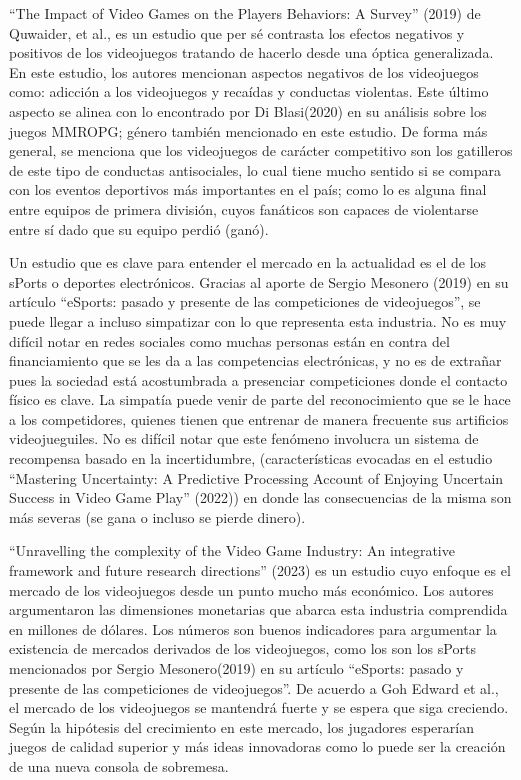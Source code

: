 \documentclass[
  letterpaper,
  DIV=11,
  numbers=noendperiod]{scrreprt}
\begin{document}
``The Impact of Video Games on the Players Behaviors: A Survey'' (2019)
de Quwaider, et al., es un estudio que per sé contrasta los efectos
negativos y positivos de los videojuegos tratando de hacerlo desde una
óptica generalizada. En este estudio, los autores mencionan aspectos
negativos de los videojuegos como: adicción a los videojuegos y recaídas
y conductas violentas. Este último aspecto se alinea con lo encontrado
por Di Blasi(2020) en su análisis sobre los juegos MMROPG; género
también mencionado en este estudio. De forma más general, se menciona
que los videojuegos de carácter competitivo son los gatilleros de este
tipo de conductas antisociales, lo cual tiene mucho sentido si se
compara con los eventos deportivos más importantes en el país; como lo
es alguna final entre equipos de primera división, cuyos fanáticos son
capaces de violentarse entre sí dado que su equipo perdió (ganó).

Un estudio que es clave para entender el mercado en la actualidad es el
de los sPorts o deportes electrónicos. Gracias al aporte de Sergio
Mesonero (2019) en su artículo ``eSports: pasado y presente de las
competiciones de videojuegos'', se puede llegar a incluso simpatizar con
lo que representa esta industria. No es muy difícil notar en redes
sociales como muchas personas están en contra del financiamiento que se
les da a las competencias electrónicas, y no es de extrañar pues la
sociedad está acostumbrada a presenciar competiciones donde el contacto
físico es clave. La simpatía puede venir de parte del reconocimiento que
se le hace a los competidores, quienes tienen que entrenar de manera
frecuente sus artificios videojueguiles. No es difícil notar que este
fenómeno involucra un sistema de recompensa basado en la incertidumbre,
(características evocadas en el estudio ``Mastering Uncertainty: A
Predictive Processing Account of Enjoying Uncertain Success in Video
Game Play'' (2022)) en donde las consecuencias de la misma son más
severas (se gana o incluso se pierde dinero).

``Unravelling the complexity of the Video Game Industry: An integrative
framework and future research directions'' (2023) es un estudio cuyo
enfoque es el mercado de los videojuegos desde un punto mucho más
económico. Los autores argumentaron las dimensiones monetarias que
abarca esta industria comprendida en millones de dólares. Los números
son buenos indicadores para argumentar la existencia de mercados
derivados de los videojuegos, como los son los sPorts mencionados por
Sergio Mesonero(2019) en su artículo ``eSports: pasado y presente de las
competiciones de videojuegos''. De acuerdo a Goh Edward et al., el
mercado de los videojuegos se mantendrá fuerte y se espera que siga
creciendo. Según la hipótesis del crecimiento en este mercado, los
jugadores esperarían juegos de calidad superior y más ideas innovadoras
como lo puede ser la creación de una nueva consola de sobremesa.
\end{document}
